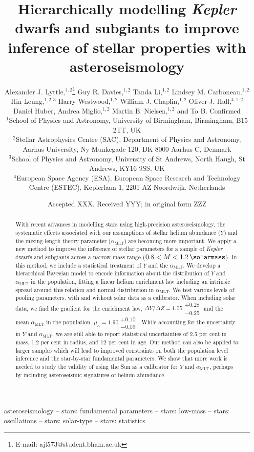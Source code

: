 \documentclass[a4paper,fleqn,usenatbib]{mnras}
\title[Hierarchically modelling dwarfs and subgiants]{
    Hierarchically modelling \emph{Kepler} dwarfs and subgiants to improve inference of stellar properties with asteroseismology
    }
\author[A. J. Lyttle et al.]{
Alexander J. Lyttle,$^{1,2}$\thanks{E-mail: ajl573@student.bham.ac.uk}
Guy R. Davies,$^{1,2}$
Tanda Li,$^{1,2}$
Lindsey M. Carboneau,$^{1,2}$
\newauthor
Hin Leung,$^{1,2,3}$
Harry Westwood,$^{1,2}$
William J. Chaplin,$^{1,2}$
Oliver J. Hall,$^{4,1,2}$
\newauthor
Daniel Huber,
Andrea Miglio,$^{1,2}$
Martin B. Nielsen,$^{1,2}$
and To B. Confirmed
\\
$^{1}$School of Physics and Astronomy, University of Birmingham, Birmingham, B15 2TT, UK\\
$^{2}$Stellar Astrophysics Centre (SAC), Department of Physics and Astronomy, Aarhus University, Ny Munkegade 120, DK-8000 Aarhus C, Denmark\\
$^{3}$School of Physics and Astronomy, University of St Andrews, North Haugh, St Andrews, KY16 9SS, UK\\
$^{4}$European Space Agency (ESA), European Space Research and Technology Centre (ESTEC), Keplerlaan 1, 2201 AZ Noordwijk, Netherlands\\
}
\date{Accepted XXX. Received YYY; in original form ZZZ}
\newcommand{\mlt}{\ensuremath{{\alpha_\mathrm{MLT}}}}
\begin{document}
\label{firstpage}
\pagerange{\pageref{firstpage}--\pageref{lastpage}}
\maketitle

\begin{abstract}
    With recent advances in modelling stars using high-precision asteroseismology, the systematic effects associated with our assumptions of stellar helium abundance ($Y$) and the mixing-length theory parameter ($\mlt$) are becoming more important. We apply a new method to improve the inference of stellar parameters for a sample of \emph{Kepler} dwarfs and subgiants across a narrow mass range ($0.8 < M < \SI{1.2}{\solarmass}$). In this method, we include a statistical treatment of $Y$ and the $\mlt$. We develop a hierarchical Bayesian model to encode information about the distribution of $Y$ and $\mlt$ in the population, fitting a linear helium enrichment law including an intrinsic spread around this relation and normal distribution in $\mlt$. We test various levels of pooling parameters, with and without solar data as a calibrator. When including solar data, we find the gradient for the enrichment law, $\Delta Y / \Delta Z = 1.05\substack{+0.28\\-0.25}$ and the mean $\mlt$ in the population, $\mu_\alpha = 1.90\substack{+0.10\\-0.09}$. While accounting for the uncertainty in $Y$ and $\mlt$, we are still able to report statistical uncertainties of 2.5 per cent in mass, 1.2 per cent in radius, and 12 per cent in age. Our method can also be applied to larger samples which will lead to improved constraints on both the population level inference and the star-by-star fundamental parameters. We show that more work is needed to study the validity of using the Sun as a calibrator for $Y$ and $\mlt$, perhaps by including asteroseismic signatures of helium abundance.
\end{abstract}

\begin{keywords}

asteroseismology -- stars: fundamental parameters -- stars: low-mass -- stars: oscillations -- stars: solar-type -- stars: statistics

\end{keywords}
\end{document}
